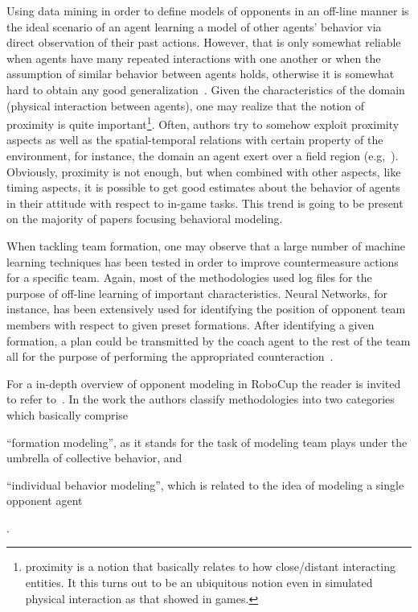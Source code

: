 Using data mining in order to define models of opponents in an off-line manner is the ideal scenario of an agent learning a model of other agents' behavior via direct observation of their past actions. However, that is only somewhat reliable when agents have many repeated interactions with one another or when the assumption of similar behavior between agents holds, otherwise it is somewhat hard to obtain any good generalization~\cite{stone_defining_2000}. Given the characteristics of the domain (physical interaction between agents), one may realize that the notion of proximity is quite important\footnote{proximity is a notion that basically relates to how close/distant interacting entities. It this turns out to be an ubiquitous notion even in simulated physical interaction as that showed in games.}. Often, authors try to somehow exploit proximity aspects as well as the spatial-temporal relations with certain property of the environment, for instance, the domain an agent exert over a field region (e.g,~\cite{riley_empirical_2002}). Obviously, proximity is not enough, but when combined with other aspects, like timing aspects, it is possible to get good estimates about the behavior of agents in their attitude with respect to in-game tasks. This trend is going to be present on the majority of papers focusing behavioral modeling.

When tackling team formation, one may observe that a large number of machine learning techniques has been tested in order to improve countermeasure actions for a specific team. Again, most of the methodologies used log files for the purpose of off-line learning of important characteristics. Neural Networks, for instance, has been extensively used for identifying the position of opponent team members with respect to given preset formations. After identifying a given formation, a plan could be transmitted by the coach agent to the rest of the team all for the purpose of performing the appropriated counteraction~\cite{nakashima_off-line_2010,ramos_discovering_2008, faria_machine_2010, visser_recognizing_2001}.


For a in-depth overview of opponent modeling in RoboCup the reader is invited to refer to~\cite{rofer_overview_2012}. In the work the authors classify methodologies into two categories which basically comprise \begin{inparaenum}\item``formation modeling'', as it stands for the task of modeling team plays under the umbrella of collective behavior, and \item``individual behavior modeling'', which is related to the idea of modeling a single opponent agent\end{inparaenum}.

